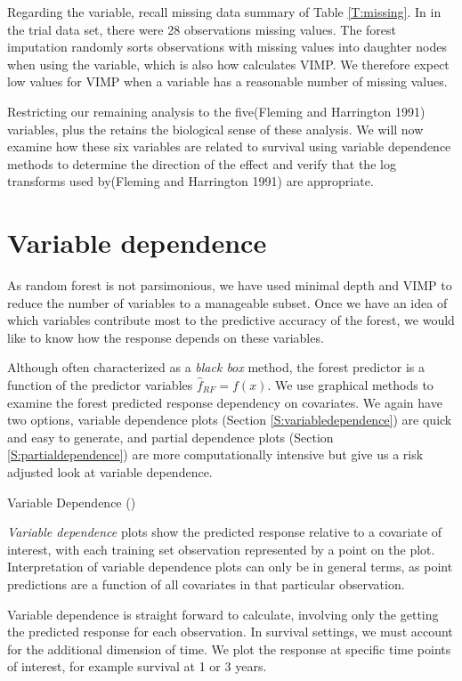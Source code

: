 \documentclass[article]{jss}
\begin{document}
Regarding the  variable, recall missing data summary of Table
\ref{T:missing}. In in the trial data set, there were 28 observations
missing  values. The forest imputation randomly sorts
observations with missing values into daughter nodes when using the
 variable, which is also how  calculates
VIMP. We therefore expect low values for VIMP when a variable has a
reasonable number of missing values.

Restricting our remaining analysis to the five(Fleming and Harrington
1991) variables, plus the  retains the biological sense of
these analysis. We will now examine how these six variables are related
to survival using variable dependence methods to determine the direction
of the effect and verify that the log transforms used by(Fleming and
Harrington 1991) are appropriate.

\section{Variable dependence}\label{variable-dependence}

As random forest is not parsimonious, we have used minimal depth and
VIMP to reduce the number of variables to a manageable subset. Once we
have an idea of which variables contribute most to the predictive
accuracy of the forest, we would like to know how the response depends
on these variables.

Although often characterized as a \emph{black box} method, the forest
predictor is a function of the predictor variables
\(\hat{f}_{RF} = f(x).\) We use graphical methods to examine the forest
predicted response dependency on covariates. We again have two options,
variable dependence plots (Section \ref{S:variabledependence}) are quick
and easy to generate, and partial dependence plots (Section
\ref{S:partialdependence}) are more computationally intensive but give
us a risk adjusted look at variable dependence.

Variable Dependence ()

\emph{Variable dependence} plots show the predicted response relative to
a covariate of interest, with each training set observation represented
by a point on the plot. Interpretation of variable dependence plots can
only be in general terms, as point predictions are a function of all
covariates in that particular observation.

Variable dependence is straight forward to calculate, involving only the
getting the predicted response for each observation. In survival
settings, we must account for the additional dimension of time. We plot
the response at specific time points of interest, for example survival
at 1 or 3 years.
\end{document}
